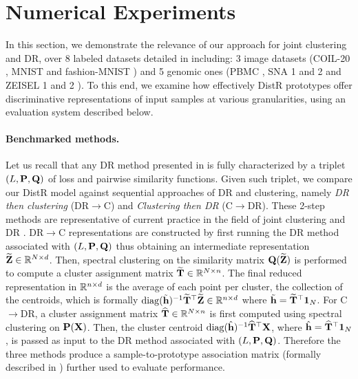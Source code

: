 
\section{Numerical Experiments}\label{sec:exps_distr}

In this section, we demonstrate the relevance of our approach for joint clustering and DR,  over 8 labeled datasets detailed in  including: 3 image datasets (COIL-20 \citep{nene1996columbia}, MNIST and fashion-MNIST \citep{xiao2017fashion}) and 5 genomic ones (PBMC \citep{wolf2018scanpy}, SNA 1 and 2 \citep{chen2019high} and ZEISEL 1 and 2 \citep{zeisel2015cell}). To this end, we examine how effectively DistR prototypes offer discriminative representations of input samples at various granularities, using an evaluation system described below.

\paragraph{Benchmarked methods.}
Let us recall that any DR method presented in  is fully characterized by a triplet $(L, {\mathbf{P}}, {\mathbf{Q}})$ of loss and pairwise similarity functions.
Given such triplet, we compare our DistR model against sequential approaches of DR and clustering, namely \emph{DR then clustering} (DR$\to$C) and \emph{Clustering then DR} (C$\to$DR). These 2-step methods are representative of current practice in the field of joint clustering and DR \citep{baran2019metacell}. DR$\to$C representations are constructed by first running the DR method associated with $(L, {\mathbf{P}}, {\mathbf{Q}})$ thus obtaining an intermediate representation $\widetilde{{\mathbf{Z}}} \in \mathbb{R}^{N \times d}$. Then, spectral clustering \citep{von2007tutorial} on the similarity matrix ${\mathbf{Q}}(\widetilde{{\mathbf{Z}}})$ is performed to compute a cluster assignment matrix $\widetilde{{\mathbf{T}}} \in \mathbb{R}^{N \times n}$. The final reduced representation in $\mathbb{R}^{n \times d}$ is the average of each point per cluster, \ie the collection of the centroids, which is formally $\operatorname{diag}(\tilde{{\mathbf{h}}})^{-1} \widetilde{{\mathbf{T}}}^\top \widetilde{{\mathbf{Z}}} \in \mathbb{R}^{n \times d}$ where $\tilde{{\mathbf{h}}} = \widetilde{{\mathbf{T}}}^\top \bm{1}_N$.
For C$\to$DR, a cluster assignment matrix $\widehat{{\mathbf{T}}} \in \mathbb{R}^{N \times n}$ is first computed using spectral clustering on ${\mathbf{P}}({\mathbf{X}})$.
Then, the cluster centroid $\operatorname{diag}(\hat{{\mathbf{h}}})^{-1} \widehat{{\mathbf{T}}}^\top {\mathbf{X}}$, where $\hat{{\mathbf{h}}} = \widehat{{\mathbf{T}}}^\top \bm{1}_N$, is passed as input to the DR method associated with $(L, {\mathbf{P}}, {\mathbf{Q}})$. Therefore the three methods produce a sample-to-prototype association matrix (formally described in ) further used to evaluate performance.

